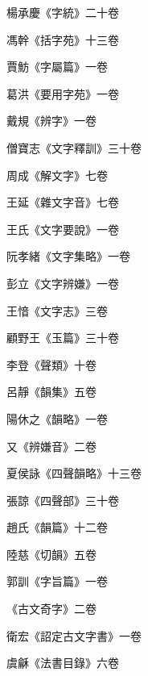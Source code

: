 \begin{pinyinscope}
 楊承慶《字統》二十卷



 馮幹《括字苑》十三卷



 賈魴《字屬篇》一卷



 葛洪《要用字苑》一卷



 戴規《辨字》一卷



 僧寶志《文字釋訓》三十卷



 周成《解文字》七卷



 王延《雜文字音》七卷



 王氏《文字要說》一卷



 阮孝緒《文字集略》一卷



 彭立《文字辨嫌》一卷



 王愔《文字志》三卷



 顧野王《玉篇》三十卷



 李登《聲類》十卷



 呂靜《韻集》五卷



 陽休之《韻略》一卷



 又《辨嫌音》二卷



 夏侯詠《四聲韻略》十三卷



 張諒《四聲部》三十卷



 趙氏《韻篇》十二卷



 陸慈《切韻》五卷



 郭訓《字旨篇》一卷



 《古文奇字》二卷



 衛宏《詔定古文字書》一卷



 虞龢《法書目錄》六卷




\end{pinyinscope}

